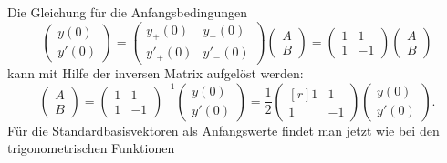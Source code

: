 Die Gleichung für die Anfangsbedingungen 
%
\[
\begin{pmatrix}
 y(0)\\
y'(0)
\end{pmatrix}
=
\begin{pmatrix}
 y_+(0) &  y_-(0) \\
y'_+(0) & y'_-(0) 
\end{pmatrix}
\begin{pmatrix}
A\\B
\end{pmatrix}
=
\begin{pmatrix}
  1     &    1    \\
  1     &   -1
\end{pmatrix}
\begin{pmatrix}
A\\B
\end{pmatrix}
\]
kann mit Hilfe der inversen Matrix aufgelöst werden:
\[
\begin{pmatrix}
A\\B
\end{pmatrix}
=
\begin{pmatrix}
  1     &    1    \\
  1     &   -1
\end{pmatrix}^{-1}
\begin{pmatrix}
 y(0)\\
y'(0)
\end{pmatrix}
=
\frac12
\begin{pmatrix*}[r]
1&1\\
1&-1
\end{pmatrix*}
\begin{pmatrix}
 y(0)\\
y'(0)
\end{pmatrix}.
\]
Für die Standardbasisvektoren als Anfangswerte findet man jetzt wie bei
den trigonometrischen Funktionen 
